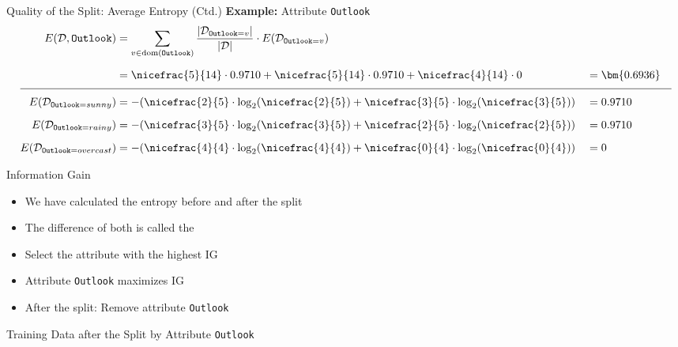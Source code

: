 \begin{frame}{Quality of the Split: Average Entropy (Ctd.)}{}
	\textbf{Example:} Attribute \texttt{Outlook}
	\begin{alignat*}{2}
		E(\mathcal{D}, \texttt{Outlook})
			&= \sum_{v \in \text{dom}(\texttt{Outlook})}
				\frac{\vert \mathcal{D}_{\texttt{Outlook} = v} \vert}{\vert \mathcal{D} \vert} \cdot E(\mathcal{D}_{\texttt{Outlook} = v}) 	\\[2mm]
			&= \nicefrac{5}{14} \cdot 0.9710 + \nicefrac{5}{14} \cdot 0.9710 + \nicefrac{4}{14} \cdot 0
			&&= \bm{0.6936}																				\\[2mm]
																										\hline
																										\\[-3mm]
		E(\mathcal{D}_{\texttt{Outlook}=sunny})
			&= -(\nicefrac{2}{5} \cdot \log_2 (\nicefrac{2}{5}) + \nicefrac{3}{5} \cdot \log_2 (\nicefrac{3}{5}))
			&&= 0.9710																					\\[2mm]
		E(\mathcal{D}_{\texttt{Outlook}=rainy})
			&= -(\nicefrac{3}{5} \cdot \log_2 (\nicefrac{3}{5}) + \nicefrac{2}{5} \cdot \log_2 (\nicefrac{2}{5}))
			&&= 0.9710																					\\[2mm]
		E(\mathcal{D}_{\texttt{Outlook}=overcast})
			&= -(\nicefrac{4}{4} \cdot \log_2 (\nicefrac{4}{4}) + \nicefrac{0}{4} \cdot \log_2 (\nicefrac{0}{4}))
			&&= 0
	\end{alignat*}
\end{frame}


\begin{frame}{Information Gain}{}
	\begin{itemize}
		\item We have calculated the entropy before and after the split
		\item The difference of both is called the 
		\item Select the attribute with the highest IG
		\vspace*{2mm}
		
		\vspace*{2mm}
		\item Attribute \texttt{Outlook} maximizes IG
		\item After the split: Remove attribute \texttt{Outlook}
	\end{itemize}
\end{frame}


\begin{frame}{Training Data after the Split by Attribute \texttt{Outlook}}{}
\end{frame}


